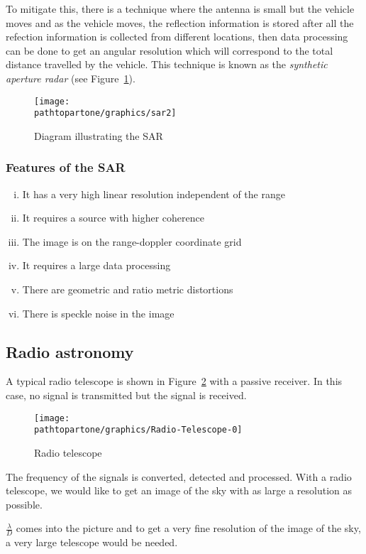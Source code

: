 To mitigate this, there is a technique where the antenna is small but the vehicle moves and as the vehicle moves, the reflection information is stored after all the refection information is collected from different locations, then data processing can be done to get an angular resolution which will correspond to the total distance travelled by the vehicle. This technique is known as the \textit{synthetic aperture radar} (see Figure~\ref{fig:sar2}).
\begin{figure}[h]
\centering
\texttt{[image: \\pathtopartone/graphics/sar2]}
\caption{Diagram illustrating the SAR}
\label{fig:sar2}
\end{figure}

\subsubsection{Features of the SAR}
\begin{enumerate}[(i)]
\item It has a very high linear resolution independent of the range
\item It requires a source with higher coherence
\item The image is on the range-doppler coordinate grid
\item It requires a large data processing
\item There are geometric and ratio metric distortions
\item There is speckle noise in the image
\end{enumerate}

\subsection{Radio astronomy} 

A typical radio telescope is shown in Figure~\ref{fig:radiotelescope0} with a passive receiver. In this case, no signal is transmitted but the signal is received.
\begin{figure}[h]
\centering
\texttt{[image: \\pathtopartone/graphics/Radio-Telescope-0]}
\caption{Radio telescope}
\label{fig:radiotelescope0}
\end{figure}

The frequency of the signals is converted, detected and processed. With a radio telescope, we would like to get an image of the sky with as large a resolution as possible.

$\frac{\lambda}{D}$ comes into the picture and to get a very fine resolution of the image of the sky, a very large telescope would be needed.


